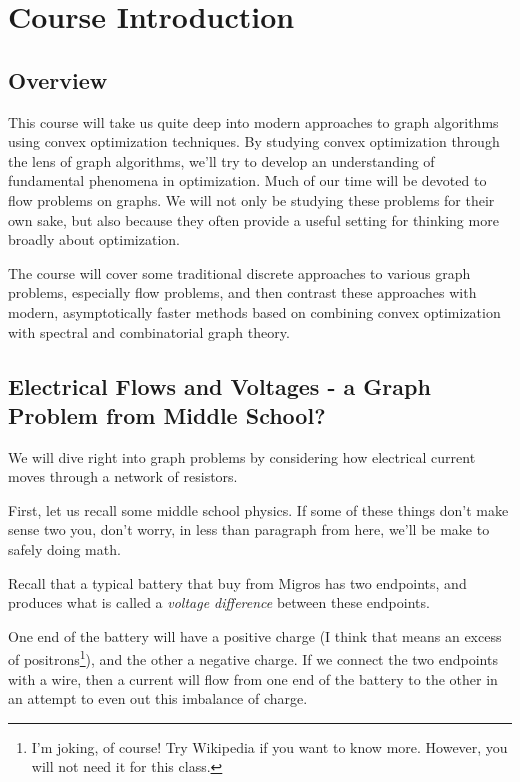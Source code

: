 \chapter{Course Introduction}
\label{cha:intro}

\sloppy

\section{Overview}
 This course will take us quite deep into modern approaches to
 graph algorithms using convex optimization techniques.
%
 By studying convex optimization through the lens of graph algorithms,
 we'll try to develop an understanding of fundamental
 phenomena in optimization.
 Much of our time will be devoted to flow problems on graphs.
 We will not only be studying these problems for their own sake,
 but also because they often provide a useful setting for thinking more broadly about optimization.

 The course will cover some traditional discrete approaches to various graph
 problems, especially flow problems, and then contrast these approaches
 with modern, asymptotically faster methods based on combining convex
 optimization with spectral and combinatorial graph theory.

\section{Electrical Flows and Voltages - a Graph Problem from Middle School?}

We will dive right into graph problems by considering how electrical
current moves through a network of resistors.

First, let us recall some middle school physics.
If some of these things don't make sense two you, don't worry, in less
than paragraph from here, we'll be make to safely doing math.

Recall that a typical battery that buy from Migros has two
endpoints, and produces what is called a \emph{voltage
  difference} between these endpoints.

One end of the battery will have a positive charge (I think that means an excess of
positrons\footnote{I'm joking, of course! Try Wikipedia if you want to know
more. However, you will not need it for this class.}), and the other a
negative charge.
If we connect the two endpoints with a wire, then a current will flow
from one end of the battery to the other in an attempt to even out
this imbalance of charge.

